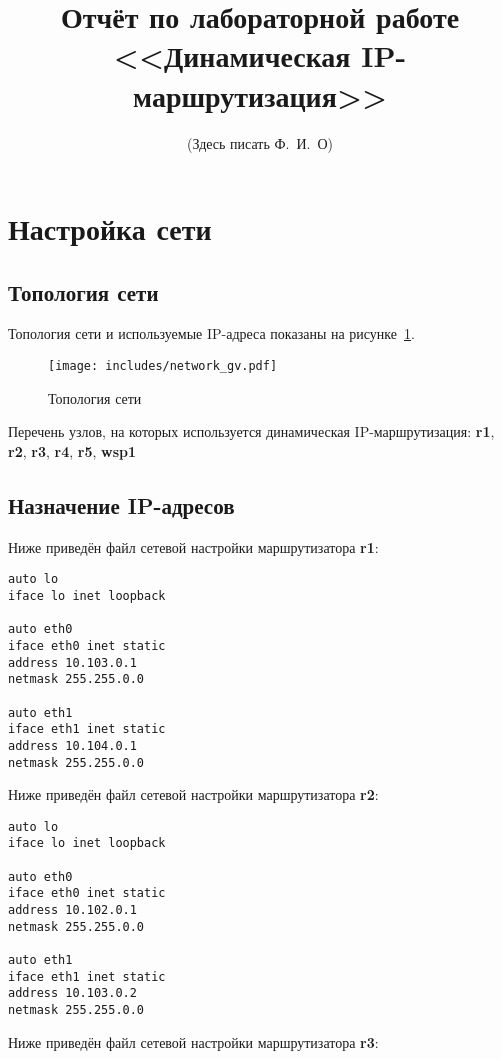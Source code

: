 \documentclass[a4paper,12pt]{article}
\title{Отчёт по лабораторной работе \\ <<Динамическая IP-маршрутизация>>}
\author{(Здесь писать Ф.~И.~О)}
\begin{document}
\maketitle

\tableofcontents

\section{Настройка сети}

\subsection{Топология сети}

Топология сети и используемые IP-адреса показаны на рисунке~\ref{fig:network}.

\begin{figure}
\centering
\texttt{[image: includes/network\_gv.pdf]}
\caption{Топология сети}
\label{fig:network}
\end{figure}

Перечень узлов, на которых используется динамическая IP-маршрутизация: 
\textbf{r1}, \textbf{r2}, \textbf{r3}, \textbf{r4}, \textbf{r5}, \textbf{wsp1}


\subsection{Назначение IP-адресов}

Ниже приведён файл сетевой настройки  маршрутизатора \textbf{r1}:

\begin{Verbatim}
auto lo
iface lo inet loopback

auto eth0
iface eth0 inet static
address 10.103.0.1
netmask 255.255.0.0

auto eth1
iface eth1 inet static
address 10.104.0.1
netmask 255.255.0.0
\end{Verbatim}

Ниже приведён файл сетевой настройки  маршрутизатора \textbf{r2}:

\begin{Verbatim}
auto lo
iface lo inet loopback

auto eth0
iface eth0 inet static
address 10.102.0.1
netmask 255.255.0.0

auto eth1
iface eth1 inet static
address 10.103.0.2
netmask 255.255.0.0
\end{Verbatim}

Ниже приведён файл сетевой настройки  маршрутизатора \textbf{r3}:
\end{document}
